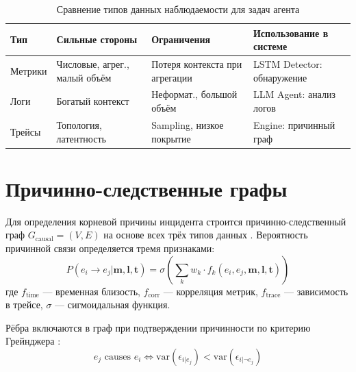 \begin{table}[H]
\centering
\small
\caption{Сравнение типов данных наблюдаемости для задач агента}
\label{tab:observability_pillars}
\setlength{\tabcolsep}{2pt}
\begin{sloppypar}
\begin{tabular}{@{}|>{\raggedright\arraybackslash}p{2cm}|>{\raggedright\arraybackslash}p{3.5cm}|>{\raggedright\arraybackslash}p{3.5cm}|>{\raggedright\arraybackslash}p{7cm}|@{}}
\hline
\textbf{Тип} & \textbf{Сильные стороны} & \textbf{Ограничения} & \textbf{Использование в системе} \\
\hline
Метрики & Числовые, агрег., малый объём & Потеря контекста при агрегации & LSTM Detector: обнаружение \\
\hline
Логи & Богатый контекст & Неформат., большой объём & LLM Agent: анализ логов \\
\hline
Трейсы & Топология, латентность & Sampling, низкое покрытие & Engine: причинный граф \\
\hline
\end{tabular}
\end{sloppypar}
\end{table}

\section{Причинно-следственные графы}

Для определения корневой причины инцидента строится причинно-следственный граф $G_{\text{causal}} = (V, E)$ на основе всех трёх типов данных \cite{distributed_tracing_survey}. Вероятность причинной связи определяется тремя признаками:
\begin{equation}
P(e_i \to e_j | \mathbf{m}, \mathbf{l}, \mathbf{t}) = \sigma\left(\sum_{k} w_k \cdot f_k(e_i, e_j, \mathbf{m}, \mathbf{l}, \mathbf{t})\right)
\label{eq:causal_probability}
\end{equation}
где $f_{\text{time}}$ --- временная близость, $f_{\text{corr}}$ --- корреляция метрик, $f_{\text{trace}}$ --- зависимость в трейсе, $\sigma$ --- сигмоидальная функция.

Рёбра включаются в граф при подтверждении причинности по критерию Грейнджера \cite{distributed_tracing_survey}:
\begin{equation}
e_j \text{ causes } e_i \Leftrightarrow \text{var}(\epsilon_{i|e_j}) < \text{var}(\epsilon_{i|\neg e_j})
\label{eq:granger_causality}
\end{equation}

